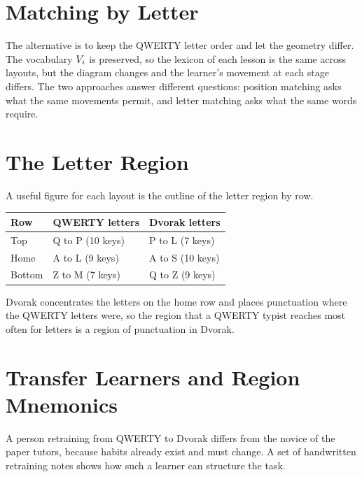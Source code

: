 \section{Matching by Letter}

The alternative is to keep the QWERTY letter order and let the geometry differ. The vocabulary $V_i$ is preserved, so the lexicon of each lesson is the same across layouts, but the diagram changes and the learner's movement at each stage differs. The two approaches answer different questions: position matching asks what the same movements permit, and letter matching asks what the same words require.

\section{The Letter Region}

A useful figure for each layout is the outline of the letter region by row.

\begin{center}
\begin{tabular}{@{}lll@{}}
\toprule
Row & QWERTY letters & Dvorak letters \\
\midrule
Top & Q to P (10 keys) & P to L (7 keys) \\
Home & A to L (9 keys) & A to S (10 keys) \\
Bottom & Z to M (7 keys) & Q to Z (9 keys) \\
\bottomrule
\end{tabular}
\end{center}

Dvorak concentrates the letters on the home row and places punctuation where the QWERTY letters were, so the region that a QWERTY typist reaches most often for letters is a region of punctuation in Dvorak.

\section{Transfer Learners and Region Mnemonics}

A person retraining from QWERTY to Dvorak differs from the novice of the paper tutors, because habits already exist and must change. A set of handwritten retraining notes shows how such a learner can structure the task.

